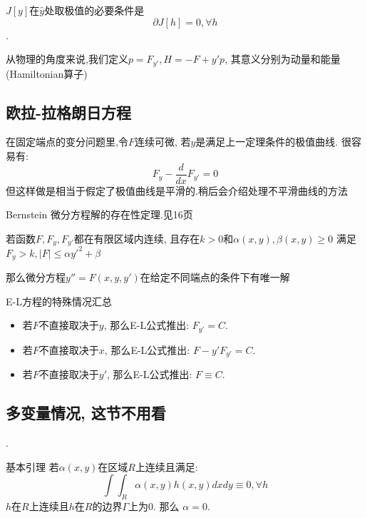 \begin{thm}
    \(J[y]\)在\(\hat y\)处取极值的必要条件是
    \[\partial J[h] = 0, \forall h\].
\end{thm}

从物理的角度来说,我们定义\(p = F_{y'}, H = -F + y'p\), 其意义分别为动量和能量(Hamiltonian算子)

\subsection{欧拉-拉格朗日方程}

在固定端点的变分问题里,令\(F\)连续可微,
若\(y\)是满足上一定理条件的极值曲线.
很容易有:
\[F_y - \frac{d}{dx}F_{y'} = 0\]
但这样做是相当于假定了极值曲线是平滑的.稍后会介绍处理不平滑曲线的方法

\begin{thm} Bernstein 微分方程解的存在性定理.见16页

    若函数\(F,F_y,F_{y'}\)都在有限区域内连续,
    且存在\(k>0\)和\(\alpha(x,y),\beta(x,y) \ge 0\)
    满足\(F_y > k, |F| \le \alpha y'^2 + \beta\)

    那么微分方程\(y'' = F(x,y,y')\)在给定不同端点的条件下有唯一解
\end{thm}


\begin{thm} E-L方程的特殊情况汇总

    \begin{itemize}
        \item 若\(F\)不直接取决于\(y\), 那么E-L公式推出:
        \(F_{y'} = C\).
        \item 若\(F\)不直接取决于\(x\), 那么E-L公式推出:
        \(F - y'F_{y'} = C\).
        \item 若\(F\)不直接取决于\(y'\), 那么E-L公式推出:
        \(F \equiv C\).
    \end{itemize}

\end{thm}

\subsection{多变量情况, 这节不用看}.

\begin{lem}基本引理
    若\(\alpha(x,y)\)在区域\(R\)上连续且满足:
    \[\int\int_R \alpha(x,y)h(x,y)dxdy \equiv 0, \forall h\]
    \(h\)在\(R\)上连续且\(h\)在\(R\)的边界\(\Gamma\)上为0. 那么
    \(\alpha = 0\).
\end{lem}

